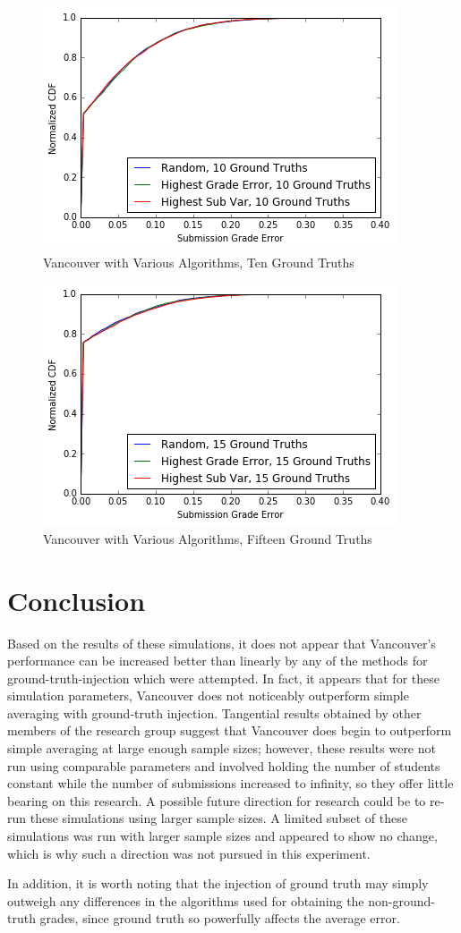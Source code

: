 \documentclass{article}
\begin{document}
	\begin{figure}[h]
		\includegraphics{alg-comparison-10}
		\caption{Vancouver with Various Algorithms, Ten Ground Truths}
		\label{fig:alg-comparison-10}
	\end{figure}
	
	\begin{figure}[h]
		\includegraphics{alg-comparison-15}
		\caption{Vancouver with Various Algorithms, Fifteen Ground Truths}
		\label{fig:alg-comparison-15}
	\end{figure}
	
	
	\section{Conclusion}
	Based on the results of these simulations, it does not appear that Vancouver's performance can be increased better than linearly by any of the methods for ground-truth-injection which were attempted. In fact, it appears that for these simulation parameters, Vancouver does not noticeably outperform simple averaging with ground-truth injection. Tangential results obtained by other members of the research group suggest that Vancouver does begin to outperform simple averaging at large enough sample sizes; however, these results were not run using comparable parameters and involved holding the number of students constant while the number of submissions increased to infinity, so they offer little bearing on this research. A possible future direction for research could be to re-run these simulations using larger sample sizes. A limited subset of these simulations was run with larger sample sizes and appeared to show no change, which is why such a direction was not pursued in this experiment. 
	
	In addition, it is worth noting that the injection of ground truth may simply outweigh any differences in the algorithms used for obtaining the non-ground-truth grades, since ground truth so powerfully affects the average error.
	
\end{document}
